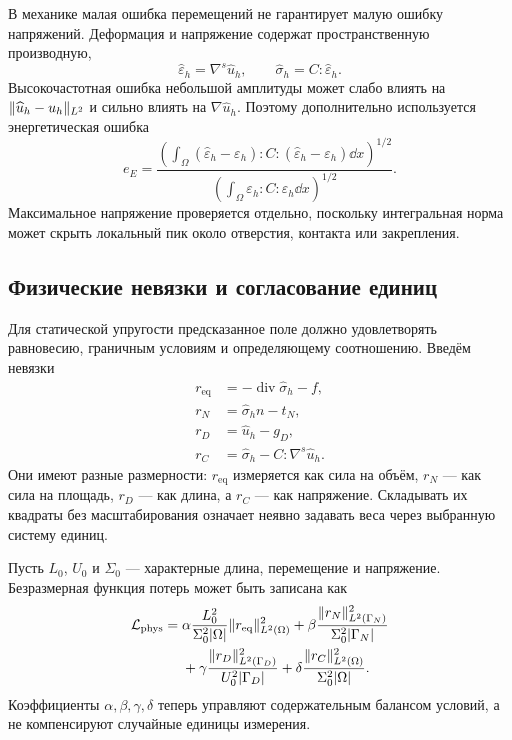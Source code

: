 В механике малая ошибка перемещений не гарантирует малую ошибку напряжений. Деформация и напряжение содержат пространственную производную,
\begin{equation}
 \widehat\varepsilon_h
 =
 \nabla^s\widehat u_h,
 \qquad
 \widehat\sigma_h
 =
 C:\widehat\varepsilon_h.
\end{equation}
Высокочастотная ошибка небольшой амплитуды может слабо влиять на $\lVert\widehat u_h-u_h\rVert_{L^2}$ и сильно влиять на $\nabla\widehat u_h$. Поэтому дополнительно используется энергетическая ошибка
\begin{equation}
 e_E
 =
 \frac{
  \left(
   \int_{\Omega}
   (\widehat\varepsilon_h-\varepsilon_h)
   :C:
   (\widehat\varepsilon_h-\varepsilon_h)
   \dd x
  \right)^{1/2}
 }{
  \left(
   \int_{\Omega}
   \varepsilon_h:C:\varepsilon_h
   \dd x
  \right)^{1/2}
 }.
\end{equation}
Максимальное напряжение проверяется отдельно, поскольку интегральная норма может скрыть локальный пик около отверстия, контакта или закрепления.

\subsection{Физические невязки и согласование единиц}
Для статической упругости предсказанное поле должно удовлетворять равновесию, граничным условиям и определяющему соотношению. Введём невязки
\begin{align}
 r_{\mathrm{eq}}
 &=
 -\operatorname{div}\widehat\sigma_h-f,
 \\
 r_N
 &=
 \widehat\sigma_h n-t_N,
 \\
 r_D
 &=
 \widehat u_h-g_D,
 \\
 r_C
 &=
 \widehat\sigma_h-C:\nabla^s\widehat u_h.
\end{align}
Они имеют разные размерности: $r_{\mathrm{eq}}$ измеряется как сила на объём, $r_N$ --- как сила на площадь, $r_D$ --- как длина, а $r_C$ --- как напряжение. Складывать их квадраты без масштабирования означает неявно задавать веса через выбранную систему единиц.

Пусть $L_0$, $U_0$ и $\Sigma_0$ --- характерные длина, перемещение и напряжение. Безразмерная функция потерь может быть записана как
\begin{equation}
\begin{aligned}
 \mathcal L_{\mathrm{phys}}
 ={}&
 \alpha
 \frac{L_0^2}{\Sigma_0^2|\Omega|}
 \lVert r_{\mathrm{eq}}\rVert_{L^2(\Omega)}^2
 +
 \beta
 \frac{\lVert r_N\rVert_{L^2(\Gamma_N)}^2}
      {\Sigma_0^2|\Gamma_N|}
 \\
 &+
 \gamma
 \frac{\lVert r_D\rVert_{L^2(\Gamma_D)}^2}
      {U_0^2|\Gamma_D|}
 +
 \delta
 \frac{\lVert r_C\rVert_{L^2(\Omega)}^2}
      {\Sigma_0^2|\Omega|}.
\end{aligned}
\end{equation}
Коэффициенты $\alpha,\beta,\gamma,\delta$ теперь управляют содержательным балансом условий, а не компенсируют случайные единицы измерения.

